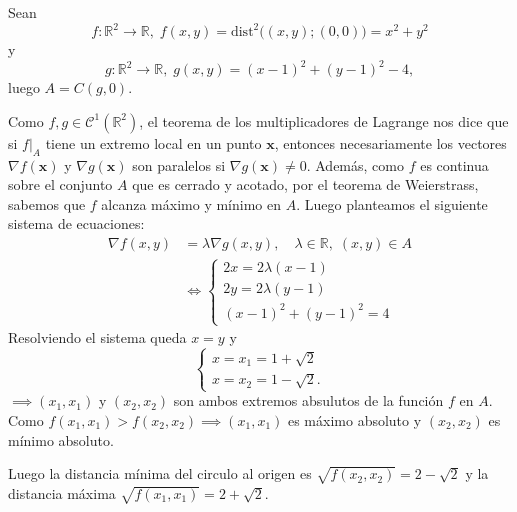\begin{solution}
    Sean
    \[
        f: \mathbb{R}^2 \rightarrow \mathbb{R}, \; f(x,y) = \text{dist}^2\Big((x,y);(0,0)\Big)  = x^2 + y^2
    \]
    y
    \[
        g: \mathbb{R}^2 \rightarrow \mathbb{R}, \; g(x,y) = (x-1)^2 + (y-1)^2 - 4,
    \]
    luego $A=C(g,0) $.

    Como $f,g \in \mathcal{C}^1( \mathbb{R}^2)$, el teorema de los multiplicadores de Lagrange nos dice que si $f \big|_A$ tiene un extremo local en un punto $\mathbf{x}$, entonces necesariamente los vectores $\nabla f(\mathbf{x})$ y $\nabla g(\mathbf{x})$ son paralelos si $\nabla g(\mathbf{x}) \neq 0$. Además, como $f$ es continua sobre el conjunto $A$ que es cerrado y acotado, por el teorema de Weierstrass, sabemos que $f$ alcanza máximo y mínimo en $A$. Luego planteamos el siguiente sistema de ecuaciones:
\[
    \begin{aligned}
        \nabla f(x,y) &= \lambda \nabla g(x,y), \quad \lambda \in \mathbb{R}, \; (x,y) \in A \\[6pt]
        &\iff \begin{cases}
            2x = 2\lambda(x-1) \\
            2y = 2\lambda(y-1) \\
            (x-1)^2 + (y-1)^2 = 4
        \end{cases}
    \end{aligned}
\]
    Resolviendo el sistema queda $x=y$  \;  y \[ \begin{cases}
            x=   x_1=1+\sqrt{2} \\
            x=  x_2=1-\sqrt{2}.
        \end{cases}\]
    $\implies (x_1,x_1)$  y $(x_2,x_2)$  son ambos extremos absulutos de la función $f$  en $A$. Como $f(x_1,x_1) > f(x_2,x_2) \implies (x_1,x_1)$ es máximo absoluto y $(x_2,x_2)$ es mínimo absoluto.

    Luego  la distancia mínima del circulo al origen es $\sqrt{f(x_2,x_2)} = 2-\sqrt{2} $ y la distancia máxima $\sqrt{f(x_1,x_1)} = 2+\sqrt{2}$.
\end{solution}


